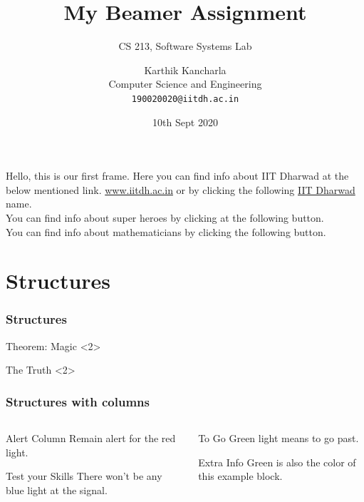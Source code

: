 \documentclass{beamer}
\title{My Beamer Assignment}
\subtitle{CS 213, Software Systems Lab}
\author[Karthik Kancharla]{Karthik Kancharla\\
Computer Science and Engineering\\
\texttt{190020020@iitdh.ac.in}}
\institute[CSE, IIT Dharwad]{Indian Institute of Technology, Dharwad}
\date{10th Sept 2020}
\begin{document}
	\frame[plain]{\titlepage}
	\begin{frame}[label = firstframe]
		Hello, this is our first frame. Here you can find info about IIT Dharwad at the below mentioned link.
		\url{www.iitdh.ac.in} or by clicking the following \href{www.iitdh.ac.in}{IIT Dharwad} name.
		\\
		You can find info about super heroes by clicking at the following button.
		\hyperlink{superheroes}{}\\
		You can find info about mathematicians by clicking the following button.
		\hyperlink{mathematicians}{}
		
	\end{frame}
	\section{Structures}
	\begin{frame}
		\frametitle{Structures}
		\begin{block}{Theorem: Magic}
			<2>
		\end{block}
		\begin{alertblock}{The Truth}
			<2>
		\end{alertblock}
	\end{frame}
	\begin{frame}
		\frametitle{Structures with columns}
		\begin{columns}
			\begin{column}{0.4\textwidth}
				\begin{alertblock}{Alert Column}
					Remain alert for the red light.
				\end{alertblock}\pause
				\begin{block}{Test your Skills}
					There won't be any blue light at the signal.
				\end{block}
			\end{column}
		\pause
		\begin{column}{0.4\textwidth}
			\begin{exampleblock}{To Go}
				Green light means to go past.
			\end{exampleblock}\pause
			\begin{exampleblock}{Extra Info}
				Green is also the color of this example block.
			\end{exampleblock}
		\end{column}
		\end{columns}
	\end{frame}
\end{document}
